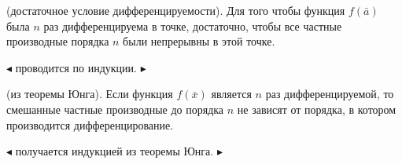 \begin{theorem}
(достаточное условие дифференцируемости). Для того чтобы функция $f(\bar{a})$ была $n$ раз дифференцируема в точке, достаточно, чтобы
все частные производные порядка $n$ были непрерывны в этой точке.
\end{theorem}
$\blacktriangleleft$
проводится по индукции.
$\blacktriangleright$
\begin{theorem}
(из теоремы Юнга). Если функция $f(\bar{x})$ является $n$ раз дифференцируемой, то смешанные частные производные до порядка $n$ не зависят от порядка, 
в котором производится дифференцирование.
\end{theorem}
$\blacktriangleleft$
получается индукцией из теоремы Юнга.
$\blacktriangleright$


